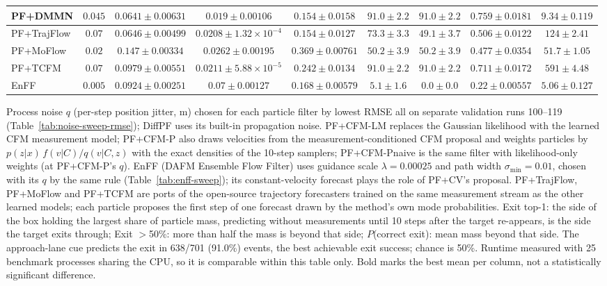 \begin{table}[ht]
\begin{adjustbox}{max width=\linewidth}
\begin{tabular}{lcccccccc}
PF+DMMN & $0.045$ & $0.0641\pm0.00631$ & $0.019\pm0.00106$ & $0.154\pm0.0158$ & $\mathbf{91.0\pm2.2}$ & $\mathbf{91.0\pm2.2}$ & $\mathbf{0.759\pm0.0181}$ & $9.34\pm0.119$ \\
\midrule
PF+TrajFlow & $0.07$ & $0.0646\pm0.00499$ & $0.0208\pm1.32\times10^{-4}$ & $0.154\pm0.0127$ & $73.3\pm3.3$ & $49.1\pm3.7$ & $0.506\pm0.0122$ & $124\pm2.41$ \\
PF+MoFlow & $0.02$ & $0.147\pm0.00334$ & $0.0262\pm0.00195$ & $0.369\pm0.00761$ & $50.2\pm3.9$ & $50.2\pm3.9$ & $0.477\pm0.0354$ & $51.7\pm1.05$ \\
PF+TCFM & $0.07$ & $0.0979\pm0.00551$ & $0.0211\pm5.88\times10^{-5}$ & $0.242\pm0.0134$ & $\mathbf{91.0\pm2.2}$ & $\mathbf{91.0\pm2.2}$ & $0.711\pm0.0172$ & $591\pm4.48$ \\
EnFF & $0.005$ & $0.0924\pm0.00251$ & $0.07\pm0.00127$ & $0.168\pm0.00579$ & $5.1\pm1.6$ & $0.0\pm0.0$ & $0.22\pm0.00557$ & $5.06\pm0.127$ \\
\bottomrule
\end{tabular}
\end{adjustbox}
\par\smallskip\parbox{0.95\linewidth}{\footnotesize Process noise $q$ (per-step position jitter, m) chosen for each particle filter by lowest RMSE all on separate validation runs 100--119 (Table~\ref{tab:noise-sweep-rmse}); DiffPF uses its built-in propagation noise. PF+CFM-LM replaces the Gaussian likelihood with the learned CFM measurement model; PF+CFM-P also draws velocities from the measurement-conditioned CFM proposal and weights particles by $p(z|x)\,f(v|C)/q(v|C,z)$ with the exact densities of the 10-step samplers; PF+CFM-Pnaive is the same filter with likelihood-only weights (at PF+CFM-P's $q$). EnFF (DAFM Ensemble Flow Filter) uses guidance scale $\lambda{=}0.00025$ and path width $\sigma_{\min}{=}0.01$, chosen with its $q$ by the same rule (Table~\ref{tab:enff-sweep}); its constant-velocity forecast plays the role of PF+CV's proposal. PF+TrajFlow, PF+MoFlow and PF+TCFM are ports of the open-source trajectory forecasters trained on the same measurement stream as the other learned models; each particle proposes the first step of one forecast drawn by the method's own mode probabilities. Exit top-1: the side of the box holding the largest share of particle mass, predicting without measurements until 10 steps after the target re-appears, is the side the target exits through; Exit $>$50\%: more than half the mass is beyond that side; $P$(correct exit): mean mass beyond that side. The approach-lane cue predicts the exit in 638/701 (91.0\%) events, the best achievable exit success; chance is 50\%. Runtime measured with 25 benchmark processes sharing the CPU, so it is comparable within this table only. Bold marks the best mean per column, not a statistically significant difference.}
\end{table}

